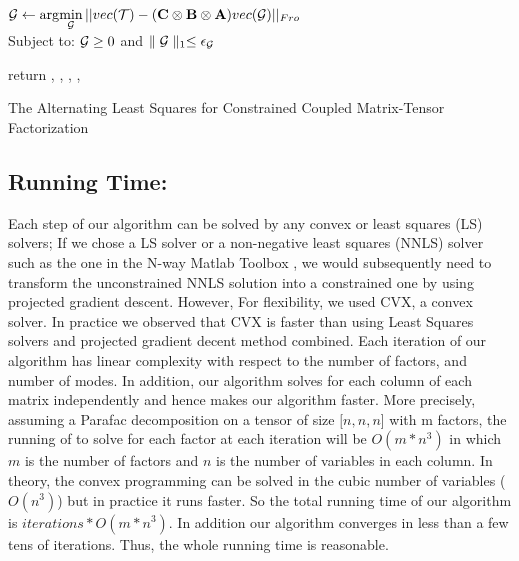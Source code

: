 \begin{algorithm}[ht!]
\begin{algorithmic}[1]
\State ${\mathbf{\mathcal{G}}} \leftarrow \arg\!\min\limits_{{\mathbf{\mathcal{G}}}} ||vec({\mathbf{\mathcal{T}}}) - ({\mathbf{C}} \otimes {\ensuremath{\mathbf{B}}} \otimes {\ensuremath{\mathbf{A}}})vec({\mathbf{\mathcal{G}}})||_{Fro}$ \label{algo_als:solveCore1}  \\ \indent\indent\indent Subject to: ${\mathbf{\mathcal{G}}} \geq 0$  and $\parallel {\ensuremath{\mathbf{\mathcal{G}}}} \parallel_{1} \leq {\ensuremath{\epsilon_{\mathbf{\mathcal{G}}}}}$ \label{algo_als:solveCore}

\EndWhile \label{algo_als:p2_end}

\State return \factA, \factB, \factC, \factD, \core
\end{algorithmic}
\caption{\label{algo_als} The Alternating Least Squares for Constrained Coupled Matrix-Tensor Factorization \ourAlgo}
\end{algorithm} 
\subsection{Running Time:}
Each step of our algorithm can be solved by any convex or least squares (LS) solvers; 
If we chose a LS solver or a non-negative least squares (NNLS) solver such as the one in the N-way Matlab Toolbox \cite{andersson2000n}, we would subsequently need to transform the unconstrained NNLS solution into a constrained one by using projected gradient descent. However, 
For flexibility, we used CVX,  a convex solver. 
In practice we observed that CVX is faster than using Least Squares solvers and projected gradient decent method combined. 
Each iteration of our algorithm has linear complexity with respect to the number of factors, and number of modes.
In addition, our algorithm solves for each column of each matrix independently and hence makes our algorithm faster. 
More precisely, assuming a Parafac decomposition on a tensor of size $[n,n,n$] with m factors, the running of to solve for each factor at each iteration will be $O(m * n ^3)$ in which $m$ is the number of factors and $n$ is the number of variables in each column.  In theory, the convex  programming can be solved in the cubic number of variables ($O(n^3)$) \cite{ye1989extension} but in practice it runs faster. So the total running time of our algorithm is $iterations * O(m * n^3)$.
In addition our algorithm converges in less than a few tens of iterations. Thus, the whole running time is reasonable.



